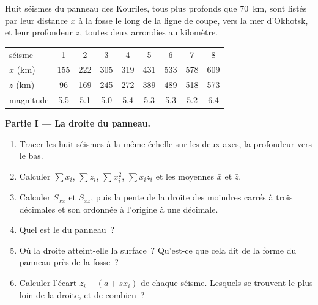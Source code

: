 \begin{problem}
\label{pb:b1:active-margins:1}
Huit séismes du panneau des Kouriles, tous plus profonds que \qty{70}{km}, sont listés
par leur distance $x$ à la fosse le long de la ligne de coupe, vers la mer
d'Okhotsk, et leur profondeur $z$, toutes deux arrondies au kilomètre.

\begin{center}
\small
\begin{tabular}{lcccccccc}
\hline
séisme & 1 & 2 & 3 & 4 & 5 & 6 & 7 & 8\\
$x$ (\unit{km}) & 155 & 222 & 305 & 319 & 431 & 533 & 578 & 609\\
$z$ (\unit{km}) & 96 & 169 & 245 & 272 & 389 & 489 & 518 & 573\\
magnitude & 5.5 & 5.1 & 5.0 & 5.4 & 5.3 & 5.3 & 5.2 & 6.4\\
\hline
\end{tabular}
\end{center}

\medskip
\noindent\textbf{Partie I --- La droite du panneau.}
\begin{enumerate}
  \item Tracer les huit séismes à la même échelle sur les deux axes, la profondeur
        vers le bas.
  \item Calculer $\sum x_i$, $\sum z_i$, $\sum x_i^2$, $\sum x_i z_i$ et les
        moyennes $\bar x$ et $\bar z$.
  \item Calculer $S_{xx}$ et $S_{xz}$, puis la pente de la droite des moindres carrés
        à trois décimales et son ordonnée à l'origine à une décimale.
  \item Quel est le  du panneau~?
  \item Où la droite atteint-elle la surface~? Qu'est-ce que cela dit de la
        forme du panneau près de la fosse~?
  \item Calculer l'écart $z_i - (a + s x_i)$ de chaque séisme. Lesquels se trouvent le
        plus loin de la droite, et de combien~?
\end{enumerate}


\end{problem}
